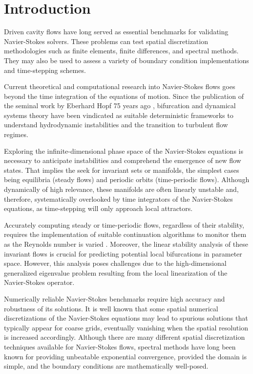 
\section{Introduction} \label{sec:intro}

Driven cavity flows have long served as essential benchmarks for validating
Navier-Stokes solvers. These problems can test spatial discretization
methodologies such as finite elements, finite differences, and spectral
methods. They may also be used to assess a variety of boundary condition
implementations and time-stepping schemes.

Current theoretical and computational research into Navier-Stokes flows goes
beyond the time integration of the equations of motion. Since the publication
of the seminal work by Eberhard Hopf 75 years ago \citep{hopf1948}, bifurcation
and dynamical systems theory have been vindicated as suitable deterministic
frameworks to understand hydrodynamic instabilities and the transition to
turbulent flow regimes.

Exploring the infinite-dimensional phase space of the Navier-Stokes equations
is necessary to anticipate instabilities and comprehend the emergence of new
flow states. That implies the seek for invariant sets or manifolds, the
simplest cases being equilibria (steady flows) and periodic orbits
(time-periodic flows). Although dynamically of high relevance, these manifolds
are often linearly unstable and, therefore, systematically overlooked by time
integrators of the Navier-Stokes equations, as time-stepping will only approach
local attractors.

Accurately computing steady or time-periodic flows, regardless of their
stability, requires the implementation of suitable continuation algorithms to
monitor them as the Reynolds number is varied \citep{kuznetsov2004}. Moreover,
the linear stability analysis of these invariant flows is crucial for
predicting potential local bifurcations in parameter space. However, this
analysis poses challenges due to the high-dimensional generalized eigenvalue
problem resulting from the local linearization of the Navier-Stokes operator.

Numerically reliable Navier-Stokes benchmarks require high accuracy and
robustness of its solutions. It is well known that some spatial numerical
discretizations of the Navier-Stokes equations may lead to spurious solutions
that typically appear for coarse grids, eventually vanishing when the spatial
resolution is increased accordingly. Although there are many different spatial
discretization techniques available for Navier-Stokes flows, spectral methods
have long been known for providing unbeatable exponential convergence, provided
the domain is simple, and the boundary conditions are mathematically
well-posed.

